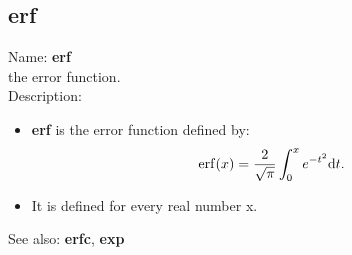 \subsection{ erf }
\noindent Name: \textbf{erf}\\
the error function.\\

\noindent Description: \begin{itemize}

\item \textbf{erf} is the error function defined by:
   $$\mathrm{erf}(x) = \frac{2}{\sqrt{\pi}} \int_0^x e^{-t^2} {\rm d}t.$$

\item It is defined for every real number x.
\end{itemize}
See also: \textbf{erfc}, \textbf{exp}
